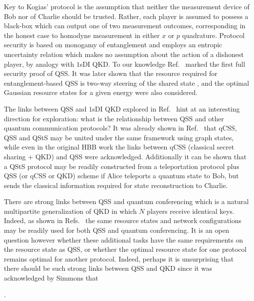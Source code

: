 Key to Kogias' protocol is the assumption that neither the measurement device of Bob nor of Charlie should be trusted. Rather, each player is assumed to possess a black-box which can output one of two measurement outcomes, corresponding in the honest case to homodyne measurement in either $x$ or $p$ quadrature. Protocol security is based on monogamy of entanglement  and employs an entropic uncertainty relation which makes no assumption about the action of a dishonest player, by analogy with $1$sDI QKD. To our knowledge Ref.~\cite{Kogias2017} marked the first full security proof of QSS. It was later shown that the resource required for entanglement-based QSS is two-way steering of the shared state \cite{Xiang2017, Xiang2018}, and the optimal Gaussian resource states for a given energy were also considered. 

The links between QSS and $1$sDI QKD explored in Ref.~\cite{Kogias2017} hint at an interesting direction for exploration: what is the relationship between QSS and other quantum communication protocols? It was already shown in Ref.~\cite{Markham2008a} that qCSS, QSS and QStS may be united under the same framework using graph states, while even in the original HBB work \cite{Hillery1999} the links between qCSS (classical secret sharing + QKD) and QSS were acknowledged. Additionally it can be shown  that a QStS protocol may be readily constructed from a teleportation protocol plus QSS (or qCSS or QKD) scheme if Alice teleports a quantum state to Bob, but sends the classical information required for state reconstruction to Charlie.

There are strong links between QSS and quantum conferencing \cite{Wu2016, Ottaviani2017b} which is a natural multipartite generalization of QKD in which $N$ players receive identical keys. Indeed, as shown in Refs.~\cite{Wu2016, Ottaviani2017b} the same resource states and network configurations may be readily used for both QSS and quantum conferencing. It is an open question however whether these additional tasks have the same requirements \cite{Kogias2017, Xiang2017} on the resource state as QSS, or whether the optimal resource state for one protocol remains optimal for another protocol. Indeed, perhaps it is unsurprising that there should be such strong links between QSS and QKD since it was acknowledged by Simmons that

.




